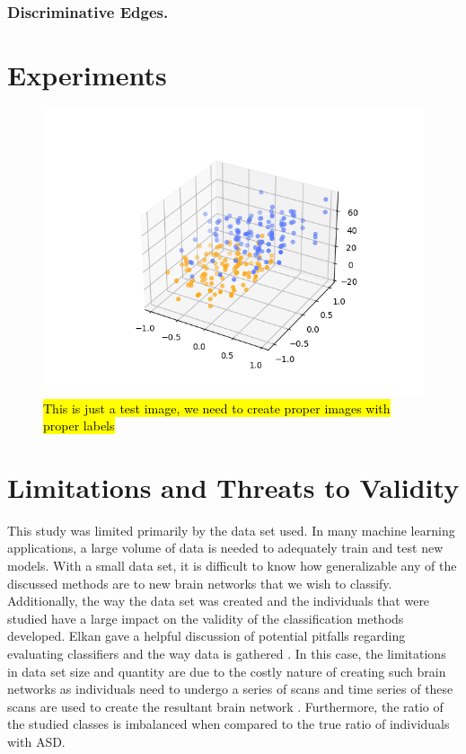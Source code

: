 \documentclass[sigconf]{acmart}
\begin{document}
\subsubsection{Discriminative Edges.}


\section{Experiments} \label{experiments}

\begin{figure}
    \centering
    \includegraphics[width=\columnwidth, keepaspectratio=true]{test.png}
    \caption{\hl{This is just a test image, we need to create proper images with proper labels}}
    \label{fig:my_label}
\end{figure}

\section{Limitations and Threats to Validity} \label{limitations}

This study was limited primarily by the data set used.
In many machine learning applications, a large volume of data is needed to adequately train and test new models.
With a small data set, it is difficult to know how generalizable any of the discussed methods are to new brain networks that we wish to classify.
Additionally, the way the data set was created and the individuals that were studied have a large impact on the validity of the classification methods developed.
Elkan gave a helpful discussion of potential pitfalls regarding evaluating classifiers and the way data is gathered \cite{elkan2012}.
In this case, the limitations in data set size and quantity are due to the costly nature of creating such brain networks as individuals need to undergo a series of scans and time series of these scans are used to create the resultant brain network \cite{lanciano2020}.
Furthermore, the ratio of the studied classes is imbalanced when compared to the true ratio of individuals with ASD.
\end{document}
